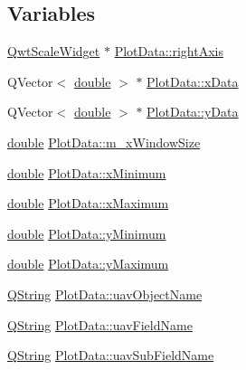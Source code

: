 \subsection*{Variables}
\begin{DoxyCompactItemize}
\item 
\hyperlink{class_qwt_scale_widget}{Qwt\-Scale\-Widget} $\ast$ \hyperlink{group___scope_plugin_gad0b4661f32046ccf0ab49100be76c1b3}{Plot\-Data\-::right\-Axis}
\item 
Q\-Vector$<$ \hyperlink{_super_l_u_support_8h_a8956b2b9f49bf918deed98379d159ca7}{double} $>$ $\ast$ \hyperlink{group___scope_plugin_ga6232b3f635142b1b11f283491a01b719}{Plot\-Data\-::x\-Data}
\item 
Q\-Vector$<$ \hyperlink{_super_l_u_support_8h_a8956b2b9f49bf918deed98379d159ca7}{double} $>$ $\ast$ \hyperlink{group___scope_plugin_ga0544d6bcbe24fc0bb460123547821457}{Plot\-Data\-::y\-Data}
\item 
\hyperlink{_super_l_u_support_8h_a8956b2b9f49bf918deed98379d159ca7}{double} \hyperlink{group___scope_plugin_gaf008f7f617cf48b623abbd095e483e10}{Plot\-Data\-::m\-\_\-x\-Window\-Size}
\item 
\hyperlink{_super_l_u_support_8h_a8956b2b9f49bf918deed98379d159ca7}{double} \hyperlink{group___scope_plugin_ga2115389376ac088ccc03fcb8a2279f8a}{Plot\-Data\-::x\-Minimum}
\item 
\hyperlink{_super_l_u_support_8h_a8956b2b9f49bf918deed98379d159ca7}{double} \hyperlink{group___scope_plugin_ga8d380f3d20ca5102bd641b5475238da6}{Plot\-Data\-::x\-Maximum}
\item 
\hyperlink{_super_l_u_support_8h_a8956b2b9f49bf918deed98379d159ca7}{double} \hyperlink{group___scope_plugin_gabb9422e4f6ced646443b98b6b4304957}{Plot\-Data\-::y\-Minimum}
\item 
\hyperlink{_super_l_u_support_8h_a8956b2b9f49bf918deed98379d159ca7}{double} \hyperlink{group___scope_plugin_gaf9ae404a5b9a749189b4cba112eb5c18}{Plot\-Data\-::y\-Maximum}
\item 
\hyperlink{group___u_a_v_objects_plugin_gab9d252f49c333c94a72f97ce3105a32d}{Q\-String} \hyperlink{group___scope_plugin_ga409edd318f86291f5b46a673ff67e7fb}{Plot\-Data\-::uav\-Object\-Name}
\item 
\hyperlink{group___u_a_v_objects_plugin_gab9d252f49c333c94a72f97ce3105a32d}{Q\-String} \hyperlink{group___scope_plugin_ga3b137cdb062886f986237f8c9b527c22}{Plot\-Data\-::uav\-Field\-Name}
\item 
\hyperlink{group___u_a_v_objects_plugin_gab9d252f49c333c94a72f97ce3105a32d}{Q\-String} \hyperlink{group___scope_plugin_ga22ac4a688fa35def44e941b82b0a0b60}{Plot\-Data\-::uav\-Sub\-Field\-Name}

\end{DoxyCompactItemize}
